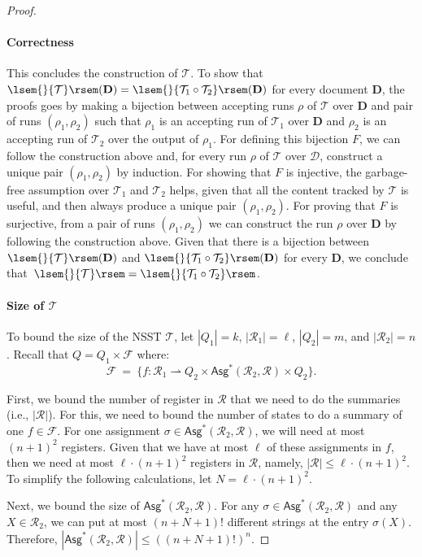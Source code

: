 \documentclass[
a4paper
]{article}
\theoremstyle{plain}
\theoremstyle{definition}
\theoremstyle{remark}
\newcommand{\doc}{\ensuremath{\mathbf{D}}}
\newcommand{\pmap}{\rightharpoonup}
\newcommand{\Reg}{\mathcal{R}}
\newcommand{\Asgs}{\operatorname{Asg}^*}
\newcommand{\nsst}{\mathcal{T}}
\newcommand{\D}{\mathcal{D}}
\newcommand{\sem}[1]{{\lsem{}{#1}\rsem}}
\renewcommand{\operatorname}[1]{\textsf{#1}}
\begin{document}
\begin{proof}
\paragraph{Correctness} This concludes the construction of $\nsst$. To show that $\sem{\nsst}(\doc) = \sem{\nsst_1 \circ \nsst_2}(\doc)$ for every document $\doc$, the proofs goes by making a bijection between accepting runs $\rho$ of $\nsst$ over $\doc$ and pair of runs $(\rho_1, \rho_2)$ such that $\rho_1$ is an accepting run of $\nsst_1$ over $\doc$ and $\rho_2$ is an accepting run of $\nsst_2$ over the output of $\rho_1$.
For defining this bijection $F$, we can follow the construction above and, for every run $\rho$ of $\nsst$ over $\D$, construct a unique pair $(\rho_1, \rho_2)$ by induction. For showing that $F$ is injective, the garbage-free assumption over $\nsst_1$ and $\nsst_2$ helps, given that all the content tracked by $\nsst$ is useful, and then always produce a unique pair $(\rho_1, \rho_2)$. For proving that $F$ is surjective, from a pair of runs $(\rho_1, \rho_2)$ we can construct the run $\rho$ over $\doc$ by following the construction above. 
Given that there is a bijection between $\sem{\nsst}(\doc)$ and $\sem{\nsst_1 \circ \nsst_2}(\doc)$ for every $\doc$, we conclude that~$\sem{\nsst} = \sem{\nsst_1\circ \nsst_2}$. 

\paragraph{Size of $\nsst$} To bound the size of the NSST $\nsst$, let $|Q_1| = k$, $|\Reg_1|=\ell$, $|Q_2| = m$, and $|\Reg_2| = n$. Recall that $Q = Q_1 \times \mathcal{F}$ where: 
\[
\mathcal{F} \ = \ \{f: \Reg_1 \pmap Q_2 \times \Asgs(\Reg_2, \Reg) \times Q_2\}.
\]

First, we bound the number of register in $\Reg$ that we need to do the summaries (i.e., $|\Reg|$). For this, we need to bound the number of states to do a summary of one $f \in \mathcal{F}$. For one assignment $\sigma \in \Asgs(\Reg_2, \Reg)$, we will need at most $(n+1)^2$ registers. Given that we have at most $\ell$ of these assignments in $f$, then we need at most $\ell \cdot (n+1)^2$ registers in $\Reg$, namely, $|\Reg| \leq \ell \cdot (n+1)^2$. To simplify the following calculations, let $N = \ell \cdot (n+1)^2$. 

Next, we bound the size of $\Asgs(\Reg_2, \Reg)$. For any $\sigma \in \Asgs(\Reg_2, \Reg)$ and any $X \in \Reg_2$, we can put at most $(n+N+1)!$ different strings at the entry $\sigma(X)$. Therefore, $|\Asgs(\Reg_2, \Reg)| \leq ((n+N+1)!)^n$.


\end{proof}
\end{document}
